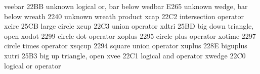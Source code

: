  veebar                22BB {unknown} logical or, bar below
 wedbar                E265 {unknown} wedge, bar below
 wreath                2240 {unknown} wreath product
 xcap                  22C2 {\bigcap} intersection operator
 xcirc                 25CB {\bigcirc} large circle
 xcup                  22C3 {\bigcup} union operator
 xdtri                 25BD {\bigtriangledown} big down triangle, open
 xodot                 2299 {\bigodot} circle dot operator
 xoplus                2295 {\bigoplus} circle plus operator
 xotime                2297 {\bigotimes} circle times operator
 xsqcup                2294 {\bigsqcup} square union operator
 xuplus                228E {\biguplus} biguplus
 xutri                 25B3 {\bigtriangleup} big up triangle, open
 xvee                  22C1 {\bigvee} logical and operator
 xwedge                22C0 {\bigwedge} logical or operator

